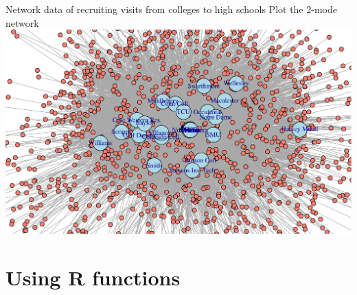\documentclass[
  8pt,
  ignorenonframetext,
  dvipsnames]{beamer}
\begin{document}
\begin{frame}{Network data of recruiting visits from colleges to high
schools}
\protect\hypertarget{network-data-of-recruiting-visits-from-colleges-to-high-schools-4}{}
Plot the 2-mode network
\includegraphics{intro_to_r_files/figure-beamer/unnamed-chunk-65-1.pdf}
\end{frame}

\hypertarget{using-r-functions}{%
\section{Using R functions}\label{using-r-functions}}
\end{document}
